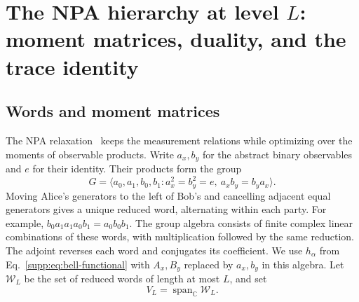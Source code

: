 \documentclass[aps,prl,onecolumn,10pt,superscriptaddress,nofootinbib,longbibliography]{revtex4-2}
\theoremstyle{remark}
\newcommand{\C}{\mathbb C}
\newcommand{\Span}{\operatorname{span}}
\begin{document}
\section{The NPA hierarchy at level \texorpdfstring{$L$}{L}: moment matrices, duality, and the trace identity}
\label{supp:sec:npa}

\subsection{Words and moment matrices}

The NPA relaxation~\cite{NPA2007,NPA2008,PironioEtAl2010} keeps the measurement relations while optimizing over the moments of observable products. Write $a_x,b_y$ for the abstract binary observables and $e$ for their identity. Their products form the group
\begin{equation}
G=\langle a_0,a_1,b_0,b_1:
a_x^2=b_y^2=e,\ a_xb_y=b_ya_x\rangle.
\label{supp:eq:group-presentation}
\end{equation}
Moving Alice's generators to the left of Bob's and cancelling adjacent equal generators gives a unique reduced word, alternating within each party. For example, $b_0a_1a_1a_0b_1=a_0b_0b_1$. The group algebra consists of finite complex linear combinations of these words, with multiplication followed by the same reduction. The adjoint reverses each word and conjugates its coefficient. We use $h_\alpha$ from Eq.~\eqref{supp:eq:bell-functional} with $A_x,B_y$ replaced by $a_x,b_y$ in this algebra. Let $\mathcal W_L$ be the set of reduced words of length at most $L$, and set
\begin{equation}
V_L=\Span_{\C}\mathcal W_L.
\label{supp:eq:VL}
\end{equation}
\end{document}
